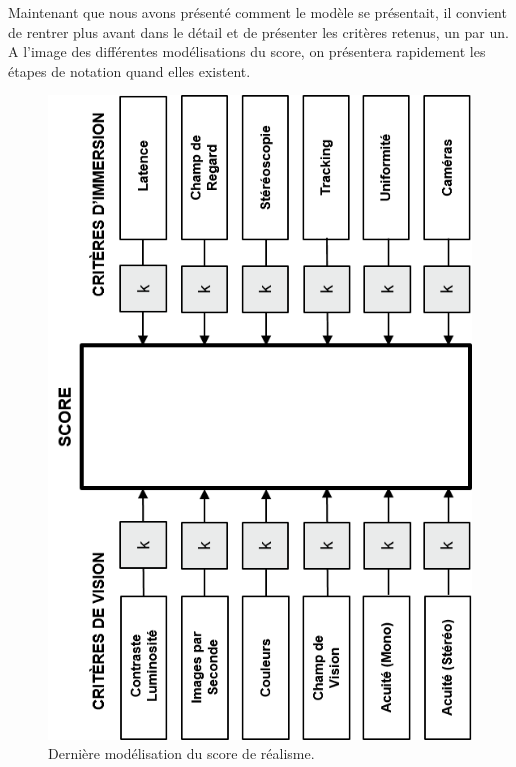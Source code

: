 	\par Maintenant que nous avons présenté comment le modèle se présentait, il convient de rentrer plus avant dans le détail et de présenter les critères retenus, un par un. A l'image des différentes modélisations du score, on présentera rapidement les étapes de notation quand elles existent.
	
	\begin{figure}
		\centering
		\includegraphics[scale=1.35]{Figures/ModeleDefinitif}
		\caption{Dernière modélisation du score de réalisme.}
		\label{fig:modèle_définitif}
	\end{figure}